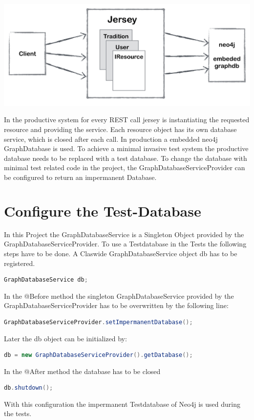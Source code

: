 \documentclass[11pt,fleqn,openany]{book} %
\begin{document}
\begin{center}
\includegraphics[scale=.40]{Pictures/jerseyoverview.png} 
\end{center}

In the productive system for every REST call jersey is instantiating the requested resource and providing the service. Each resource object has its own database service, which is closed after each call. In production a embedded neo4j GraphDatabase is used. To achieve a minimal invasive test system the productive database needs to be replaced with a test database. To change the database with minimal test related code in the project, the GraphDatabaseServiceProvider can be configured to return an impermanent Database.


\chapter{Configure the Test-Database}

In this Project the GraphDatabaseService is a Singleton Object provided by the GraphDatabaseServiceProvider. To use a Testdatabase in the Tests the following steps have to be done.
A Claswide GraphDatabaseService object db has to be registered.

\begin{lstlisting}[language=java]
    GraphDatabaseService db;
\end{lstlisting}
In the @Before method the singleton GraphDatabaseService provided by the GraphDatabaseServiceProvider has to be overwritten by the following line:

\begin{lstlisting}[language=java]
    GraphDatabaseServiceProvider.setImpermanentDatabase();
\end{lstlisting}
Later the db object can be initialized by:
\begin{lstlisting}[language=java]
    db = new GraphDatabaseServiceProvider().getDatabase();
\end{lstlisting}
In the @After method the database has to be closed
\begin{lstlisting}[language=java]
    db.shutdown();
\end{lstlisting}
With this configuration the impermanent Testdatabase of Neo4j is used during the tests. 
\end{document}
